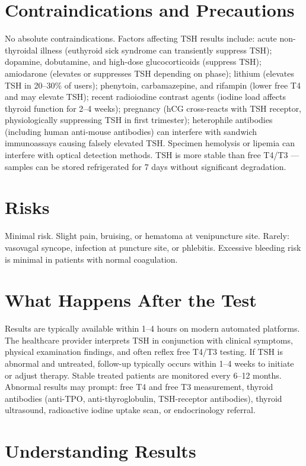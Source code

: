 \section*{Contraindications and Precautions}
No absolute contraindications. Factors affecting TSH results include: acute non-thyroidal illness (euthyroid sick syndrome can transiently suppress TSH); dopamine, dobutamine, and high-dose glucocorticoids (suppress TSH); amiodarone (elevates or suppresses TSH depending on phase); lithium (elevates TSH in 20--30\% of users); phenytoin, carbamazepine, and rifampin (lower free T4 and may elevate TSH); recent radioiodine contrast agents (iodine load affects thyroid function for 2--4 weeks); pregnancy (hCG cross-reacts with TSH receptor, physiologically suppressing TSH in first trimester); heterophile antibodies (including human anti-mouse antibodies) can interfere with sandwich immunoassays causing falsely elevated TSH. Specimen hemolysis or lipemia can interfere with optical detection methods. TSH is more stable than free T4/T3 --- samples can be stored refrigerated for 7 days without significant degradation.

\section*{Risks}
Minimal risk. Slight pain, bruising, or hematoma at venipuncture site. Rarely: vasovagal syncope, infection at puncture site, or phlebitis. Excessive bleeding risk is minimal in patients with normal coagulation.

\section*{What Happens After the Test}
Results are typically available within 1--4 hours on modern automated platforms. The healthcare provider interprets TSH in conjunction with clinical symptoms, physical examination findings, and often reflex free T4/T3 testing. If TSH is abnormal and untreated, follow-up typically occurs within 1--4 weeks to initiate or adjust therapy. Stable treated patients are monitored every 6--12 months. Abnormal results may prompt: free T4 and free T3 measurement, thyroid antibodies (anti-TPO, anti-thyroglobulin, TSH-receptor antibodies), thyroid ultrasound, radioactive iodine uptake scan, or endocrinology referral.

\section*{Understanding Results}

